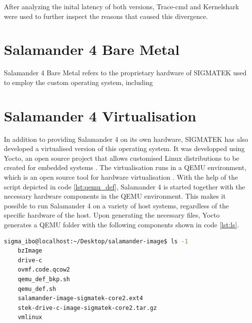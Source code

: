\documentclass[MMR,Master,english]{twbook}
\begin{document}
After analyzing the inital latency of both versions, Trace-cmd and Kernelshark were used to further inspect the reasons that caused this divergence. 


\section{Salamander 4 Bare Metal}
Salamander 4 Bare Metal refers to the proprietary hardware of SIGMATEK used to employ the custom operating system, including 

\section{Salamander 4 Virtualisation}
In addition to providing Salamander 4 on its own hardware, SIGMATEK has also developed a virtualised version of this operating system. It was developped using Yocto, an open source project that allows customised Linux distributions to be created for embedded systems \cite{WelcomeYoctoProject}. The virtualisation runs in a QEMU environment, which is an open source tool for hardware virtualisation \cite{QEMU}. With the help of the script depicted in code \ref{lst:qemu_def}, Salamander 4 is started together with the necessary hardware components in the QEMU environment. This makes it possible to run Salamander 4 on a variety of host systems, regardless of the specific hardware of the host. Upon generating the necessary files, Yocto generates a QEMU folder with the following components shown in code \ref{lst:ls}.

\vspace{1em}
\begin{minipage}{\linewidth}
    \begin{lstlisting}[language=bash,name={Contents of QEMU folder for Salamander 4},label={lst:ls}]
    sigma_ibo@localhost:~/Desktop/salamander-image$ ls -1
    bzImage
    drive-c
    ovmf.code.qcow2
    qemu_def_bkp.sh
    qemu_def.sh
    salamander-image-sigmatek-core2.ext4
    stek-drive-c-image-sigmatek-core2.tar.gz
    vmlinux
    \end{lstlisting}
    \end{minipage}
    
\end{document}

